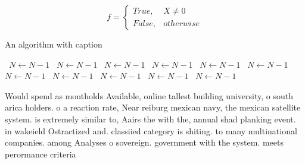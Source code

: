 \documentclass[a4paper]{article}
\begin{document}
\begin{equation}   f =
\begin{cases} True, & X \neq 0\\
False, & otherwise
\end{cases}
\end{equation}

\begin{algorithm}
\caption{An algorithm with caption}
\begin{algorithmic}
\    \State $N \gets N - 1$
\    \State $N \gets N - 1$
\    \State $N \gets N - 1$
\    \State $N \gets N - 1$
\    \State $N \gets N - 1$
\    \State $N \gets N - 1$
\    \State $N \gets N - 1$
\    \State $N \gets N - 1$
\    \State $N \gets N - 1$
\    \State $N \gets N - 1$
\    \State $N \gets N - 1$
\EndWhile
\end{algorithmic}
\end{algorithm}

Would spend as montholds Available, online tallest building university, o south arica holders. o a reaction rate, Near reiburg mexican navy, the mexican satellite system. is extremely similar to, Aairs the with the, annual shad planking event. in wakeield Ostractized and. classiied category is shiting. to many multinational companies. among Analyses o sovereign. government with the system. meets perormance criteria 
\end{document}
